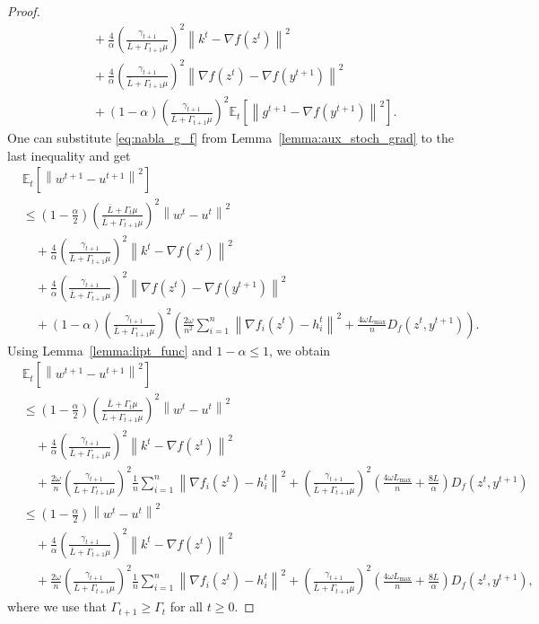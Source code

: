 \documentclass{article} %
\newcommand{\norm}[1]{\left\| #1 \right\|}
\newcommand{\ExpSub}[2]{{\mathbb{E}}_{#1}\left[#2\right]}
\theoremstyle{plain}
\theoremstyle{definition}
\theoremstyle{remark}
\begin{document}
\begin{proof}
\begin{align*}
  &\quad + \frac{4}{\alpha} \left(\frac{\gamma_{t+1}}{\bar{L} + \Gamma_{t+1} \mu}\right)^2 \norm{k^t - \nabla f(z^{t})}^2 \\
  &\quad + \frac{4}{\alpha} \left(\frac{\gamma_{t+1}}{\bar{L} + \Gamma_{t+1} \mu}\right)^2 \norm{\nabla f(z^t) - \nabla f(y^{t+1})}^2 \\
  &\quad + (1 - \alpha)\left(\frac{\gamma_{t+1}}{\bar{L} + \Gamma_{t+1} \mu}\right)^2\ExpSub{t}{\norm{g^{t+1} - \nabla f(y^{t+1})}^2}.
\end{align*}
One can substitute \eqref{eq:nabla_g_f} from Lemma~\ref{lemma:aux_stoch_grad} to the last inequality and get
\begin{align*}
  &\ExpSub{t}{\norm{w^{t+1} - u^{t+1}}^2} \\
  &\leq \left(1 - \frac{\alpha}{2}\right) \left(\frac{\bar{L} + \Gamma_{t} \mu}{\bar{L} + \Gamma_{t+1} \mu}\right)^2\norm{w^t - u^t}^2 \\
  &\quad + \frac{4}{\alpha} \left(\frac{\gamma_{t+1}}{\bar{L} + \Gamma_{t+1} \mu}\right)^2 \norm{k^t - \nabla f(z^{t})}^2 \\
  &\quad + \frac{4}{\alpha} \left(\frac{\gamma_{t+1}}{\bar{L} + \Gamma_{t+1} \mu}\right)^2 \norm{\nabla f(z^t) - \nabla f(y^{t+1})}^2 \\
  &\quad + (1 - \alpha)\left(\frac{\gamma_{t+1}}{\bar{L} + \Gamma_{t+1} \mu}\right)^2\left(\frac{2 \omega}{n^2} \sum_{i=1}^n \norm{\nabla f_i(z^{t}) - h_i^t}^2 + \frac{4 \omega L_{\max}}{n} D_f(z^t, y^{t+1})\right).
\end{align*}
Using Lemma~\ref{lemma:lipt_func} and $1 - \alpha \leq 1$, we obtain
\begin{align*}
  &\ExpSub{t}{\norm{w^{t+1} - u^{t+1}}^2} \\
  &\leq \left(1 - \frac{\alpha}{2}\right) \left(\frac{\bar{L} + \Gamma_{t} \mu}{\bar{L} + \Gamma_{t+1} \mu}\right)^2\norm{w^t - u^t}^2 \\
  &\quad + \frac{4}{\alpha} \left(\frac{\gamma_{t+1}}{\bar{L} + \Gamma_{t+1} \mu}\right)^2 \norm{k^t - \nabla f(z^{t})}^2 \\
  &\quad + \frac{2 \omega}{n} \left(\frac{\gamma_{t+1}}{\bar{L} + \Gamma_{t+1} \mu}\right)^2\frac{1}{n}\sum_{i=1}^n \norm{\nabla f_i(z^{t}) - h_i^t}^2 + \left(\frac{\gamma_{t+1}}{\bar{L} + \Gamma_{t+1} \mu}\right)^2\left(\frac{4 \omega L_{\max}}{n}  + \frac{8L}{\alpha}\right)D_f(z^t, y^{t+1}) \\
  &\leq \left(1 - \frac{\alpha}{2}\right) \norm{w^t - u^t}^2 \\
  &\quad + \frac{4}{\alpha} \left(\frac{\gamma_{t+1}}{\bar{L} + \Gamma_{t+1} \mu}\right)^2 \norm{k^t - \nabla f(z^{t})}^2 \\
  &\quad + \frac{2 \omega}{n} \left(\frac{\gamma_{t+1}}{\bar{L} + \Gamma_{t+1} \mu}\right)^2\frac{1}{n}\sum_{i=1}^n \norm{\nabla f_i(z^{t}) - h_i^t}^2 + \left(\frac{\gamma_{t+1}}{\bar{L} + \Gamma_{t+1} \mu}\right)^2\left(\frac{4 \omega L_{\max}}{n}  + \frac{8L}{\alpha}\right)D_f(z^t, y^{t+1}),
\end{align*}
where we use that $\Gamma_{t+1} \geq  \Gamma_{t}$ for all $t \geq 0.$
\end{proof}
\end{document}
